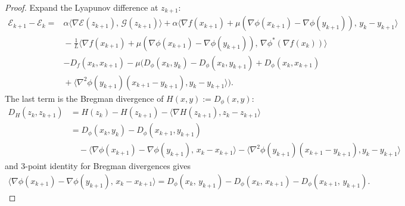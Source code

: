 \documentclass{article}
\theoremstyle{plain}
\theoremstyle{definition}
\theoremstyle{remark}
\begin{document}
\begin{proof}
Expand the Lyapunov difference at $z_{k+1}$:
\[
\begin{aligned}
\mathcal{E}_{k+1}-\mathcal{E}_k
={}&\alpha\langle \nabla \mathcal{E}(z_{k+1}),\,\mathcal{G}(z_{k+1})\rangle + \alpha\langle \nabla f(x_{k+1})+\mu(\nabla\phi(x_{k+1})-\nabla\phi(y_{k+1})),\,y_k-y_{k+1}\rangle \\&{}-\frac{1}{L}\langle \nabla f(x_{k+1})+\mu(\nabla \phi(x_{k+1})-\nabla\phi(y_{k+1})),\,\nabla\phi^*(\nabla f(x_{k}))\rangle \\
{}&-D_f(x_k,x_{k+1})-\mu(D_\phi(x_k,y_k)-D_\phi(x_{k},y_{k+1})+D_\phi(x_k,x_{k+1})\\&{}+\langle \nabla^2\phi(y_{k+1})(x_{k+1}-y_{k+1}),y_k-y_{k+1}\rangle).
\end{aligned}
\]
The last term is the Bregman divergence of $H(x,y):=D_\phi(x,y)$:
\[
\begin{aligned}
    D_H(z_k,z_{k+1})
    &=
   H(z_k)-H(z_{k+1})-\langle \nabla H(z_{k+1}),z_k-z_{k+1}\rangle \\
   &=
   D_\phi(x_k,y_k)-D_\phi(x_{k+1},y_{k+1})\\
    &\quad -\langle \nabla\phi(x_{k+1})-\nabla\phi(y_{k+1}),\,x_k-x_{k+1}\rangle
    -\langle \nabla^2\phi(y_{k+1})(x_{k+1}-y_{k+1}),y_k-y_{k+1}\rangle
\end{aligned}
\]
and 3-point identity for Bregman divergences gives
\[
\begin{aligned}
    \langle \nabla\phi(x_{k+1})-\nabla\phi(y_{k+1}),\,x_k-x_{k+1}\rangle
= D_\phi(x_k,\,y_{k+1}) - D_\phi(x_k,\,x_{k+1}) - D_\phi(x_{k+1},\,y_{k+1}).
\end{aligned}
\]



\end{proof}
\end{document}
